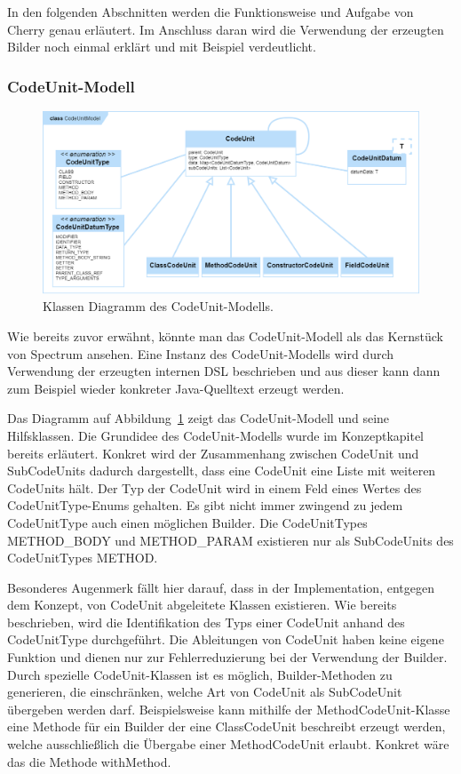 \documentclass[12pt,oneside,a4paper,parskip]{scrbook}
\begin{document}
In den folgenden Abschnitten werden die Funktionsweise und Aufgabe von Cherry genau erläutert. Im Anschluss daran wird die Verwendung der erzeugten Bilder noch einmal erklärt und mit Beispiel verdeutlicht.

\subsubsection{CodeUnit-Modell}

\begin{figure}[htbp]
\centering
\includegraphics[width=1.0\textwidth]{bilder/classCu}
\caption{Klassen Diagramm des CodeUnit-Modells.}
\label{fig:classcu}
\end{figure}

Wie bereits zuvor erwähnt, könnte man das CodeUnit-Modell als das Kernstück von Spectrum ansehen. Eine Instanz des CodeUnit-Modells wird durch Verwendung der erzeugten internen DSL beschrieben und aus dieser kann dann zum Beispiel wieder konkreter Java-Quelltext erzeugt werden.

Das Diagramm auf Abbildung~\ref{fig:classcu} zeigt das CodeUnit-Modell und seine Hilfsklassen.
Die Grundidee des CodeUnit-Modells wurde im Konzeptkapitel bereits erläutert. Konkret wird der Zusammenhang zwischen CodeUnit und SubCodeUnits dadurch dargestellt, dass eine CodeUnit eine Liste mit weiteren CodeUnits hält. Der Typ der CodeUnit wird in einem Feld eines Wertes des CodeUnitType-Enums gehalten. Es gibt nicht immer zwingend zu jedem CodeUnitType auch einen möglichen Builder. Die CodeUnitTypes METHOD\_BODY und METHOD\_PARAM existieren nur als SubCodeUnits des \mbox{CodeUnitTypes} METHOD.

Besonderes Augenmerk fällt hier darauf, dass in der Implementation, entgegen dem Konzept, von CodeUnit abgeleitete Klassen existieren. Wie bereits beschrieben, wird die Identifikation des Typs einer CodeUnit anhand des CodeUnitType durchgeführt. Die Ableitungen von CodeUnit haben keine eigene Funktion und dienen nur zur Fehlerreduzierung bei der Verwendung der Builder. Durch spezielle CodeUnit-Klassen ist es möglich, Builder-Methoden zu generieren, die einschränken, welche Art von CodeUnit als SubCodeUnit übergeben werden darf. Beispielsweise kann mithilfe der MethodCodeUnit-Klasse eine Methode für ein Builder der eine ClassCodeUnit beschreibt erzeugt werden, welche ausschließlich die Übergabe einer MethodCodeUnit erlaubt. Konkret wäre das die Methode withMethod.
\end{document}
